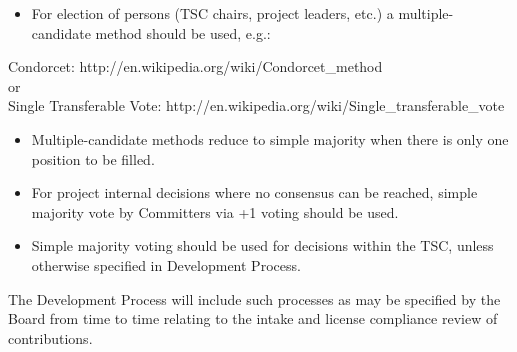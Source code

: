 \documentclass[a4paper, 12pt]{book}
\begin{document}
\begin{itemize}\itemsep0pt
\item{For election of persons (TSC chairs, project leaders, etc.) a multiple-candidate method should be used, e.g.:}
\end{itemize}
Condorcet: http://en.wikipedia.org/wiki/Condorcet\_method
\\
or\\
Single Transferable Vote: http://en.wikipedia.org/wiki/Single\_transferable\_vote
\begin{itemize}\itemsep0pt
\item{Multiple-candidate methods reduce to simple majority when there is only one position to be filled.}
\item{For project internal decisions where no consensus can be reached, simple majority vote by Committers via +1 voting should be used}.
\item{Simple majority voting should be used for decisions within the TSC, unless otherwise specified in Development Process}.
\end{itemize}
The Development Process will include such processes as may be specified by the Board from time to time relating to the intake and license compliance review of contributions.
\end{document}
